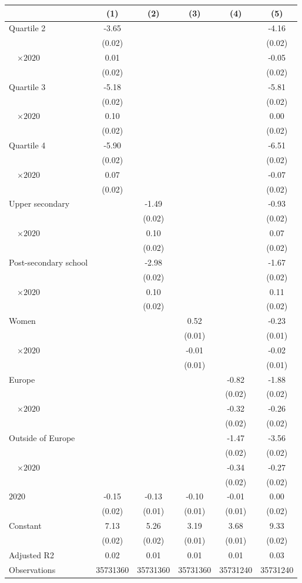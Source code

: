
\begin{tabular}{@{}l*{5}{S[table-format={-}2.2{\tnote{***}}]}@{}}
\toprule
{} & {(1)} & {(2)} & {(3)} & {(4)} & {(5)}\tabularnewline%
\midrule
Quartile 2 & -3.65\tnote{***} &  &  &  & -4.16\tnote{***}\tabularnewline%
 & (0.02) &  &  &  & \vphantom{5} (0.02)\tabularnewline%
~~\(\times 2020\) & 0.01 &  &  &  & -0.05\tnote{*}\tabularnewline%
 & (0.02) &  &  &  & \vphantom{4} (0.02)\tabularnewline%
Quartile 3 & -5.18\tnote{***} &  &  &  & -5.81\tnote{***}\tabularnewline%
 & (0.02) &  &  &  & \vphantom{3} (0.02)\tabularnewline%
~~\(\times 2020\) & 0.10\tnote{***} &  &  &  & 0.00\tabularnewline%
 & (0.02) &  &  &  & \vphantom{2} (0.02)\tabularnewline%
Quartile 4 & -5.90\tnote{***} &  &  &  & -6.51\tnote{***}\tabularnewline%
 & (0.02) &  &  &  & \vphantom{1} (0.02)\tabularnewline%
~~\(\times 2020\) & 0.07\tnote{***} &  &  &  & -0.07\tnote{**}\tabularnewline%
 & (0.02) &  &  &  & (0.02)\tabularnewline%
Upper secondary &  & -1.49\tnote{***} &  &  & -0.93\tnote{***}\tabularnewline%
 &  & (0.02) &  &  & \vphantom{3} (0.02)\tabularnewline%
~~\(\times 2020\) &  & 0.10\tnote{***} &  &  & 0.07\tnote{***}\tabularnewline%
 &  & (0.02) &  &  & \vphantom{2} (0.02)\tabularnewline%
Post-secondary school &  & -2.98\tnote{***} &  &  & -1.67\tnote{***}\tabularnewline%
 &  & (0.02) &  &  & \vphantom{1} (0.02)\tabularnewline%
~~\(\times 2020\) &  & 0.10\tnote{***} &  &  & 0.11\tnote{***}\tabularnewline%
 &  & (0.02) &  &  & (0.02)\tabularnewline%
Women &  &  & 0.52\tnote{***} &  & -0.23\tnote{***}\tabularnewline%
 &  &  & (0.01) &  & \vphantom{1} (0.01)\tabularnewline%
~~\(\times 2020\) &  &  & -0.01 &  & -0.02\tabularnewline%
 &  &  & (0.01) &  & (0.01)\tabularnewline%
Europe &  &  &  & -0.82\tnote{***} & -1.88\tnote{***}\tabularnewline%
 &  &  &  & (0.02) & \vphantom{3} (0.02)\tabularnewline%
~~\(\times 2020\) &  &  &  & -0.32\tnote{***} & -0.26\tnote{***}\tabularnewline%
 &  &  &  & (0.02) & \vphantom{2} (0.02)\tabularnewline%
Outside of Europe &  &  &  & -1.47\tnote{***} & -3.56\tnote{***}\tabularnewline%
 &  &  &  & (0.02) & \vphantom{1} (0.02)\tabularnewline%
~~\(\times 2020\) &  &  &  & -0.34\tnote{***} & -0.27\tnote{***}\tabularnewline%
 &  &  &  & (0.02) & (0.02)\tabularnewline%
\midrule
\(2020\) & -0.15\tnote{***} & -0.13\tnote{***} & -0.10\tnote{***} & -0.01\tnote{\dagger} & 0.00\tabularnewline%
 & (0.02) & (0.01) & (0.01) & (0.01) & (0.02)\tabularnewline%
Constant & 7.13\tnote{***} & 5.26\tnote{***} & 3.19\tnote{***} & 3.68\tnote{***} & 9.33\tnote{***}\tabularnewline%
 & (0.02) & (0.02) & (0.01) & (0.01) & (0.02)\tabularnewline%
\midrule
Adjusted R2 & 0.02 & 0.01 & 0.01 & 0.01 & 0.03\tabularnewline%
Observations & {\num{35731360}} & {\num{35731360}} & {\num{35731360}} & {\num{35731240}} & {\num{35731240}}\tabularnewline%
\bottomrule
\end{tabular}
